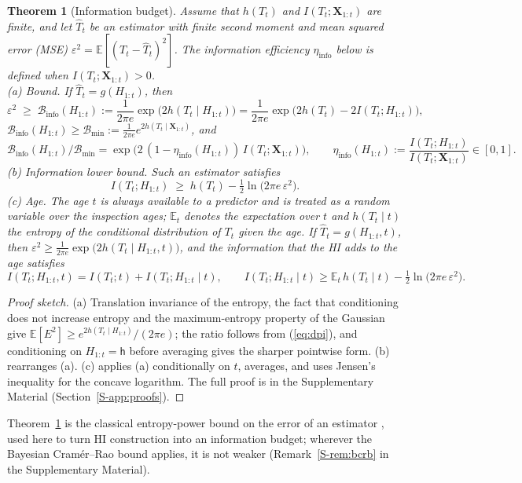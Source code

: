 \documentclass[preprint,12pt]{elsarticle}
\newtheorem{theorem}{Theorem}
\theoremstyle{definition}
\newcommand{\E}{\mathbb{E}}
\newcommand{\Binfo}{\mathcal{B}_{\mathrm{info}}}
\newcommand{\etaPIE}{\eta_{\mathrm{info}}}
\begin{document}
\begin{theorem}[Information budget]
\label{thm:bound}
Assume that $h(T_t)$ and $I(T_t;\mathbf{X}_{1:t})$ are finite, and let $\hat T_t$ be an estimator with finite second moment and mean squared error (MSE) $\varepsilon^2=\E[(T_t-\hat T_t)^2]$. The information efficiency $\etaPIE$ below is defined when $I(T_t;\mathbf{X}_{1:t})>0$.\\
(a) \emph{Bound.} If $\hat T_t=g(H_{1:t})$, then
\begin{equation}
\varepsilon^2\;\ge\;\Binfo(H_{1:t}) := \frac{1}{2\pi e}\exp\!\big(2h(T_t\mid H_{1:t})\big)=\frac{1}{2\pi e}\exp\!\big(2h(T_t)-2I(T_t;H_{1:t})\big),
\end{equation}
$\Binfo(H_{1:t})\ge \mathcal{B}_{\min}:=\frac{1}{2\pi e}e^{2h(T_t\mid \mathbf{X}_{1:t})}$, and
\begin{equation}
\Binfo(H_{1:t})/\mathcal{B}_{\min}=\exp\!\big(2\,(1-\etaPIE(H_{1:t}))\,I(T_t;\mathbf{X}_{1:t})\big),\qquad \etaPIE(H_{1:t}):=\frac{I(T_t;H_{1:t})}{I(T_t;\mathbf{X}_{1:t})}\in[0,1].
\end{equation}
(b) \emph{Information lower bound.} Such an estimator satisfies
\begin{equation}
I(T_t;H_{1:t})\;\ge\;h(T_t)-\tfrac12\ln\!\big(2\pi e\,\varepsilon^2\big).
\end{equation}
(c) \emph{Age.} The age $t$ is always available to a predictor and is treated as a random variable over the inspection ages; $\E_t$ denotes the expectation over $t$ and $h(T_t\mid t)$ the entropy of the conditional distribution of $T_t$ given the age. If $\hat T_t=g(H_{1:t},t)$, then $\varepsilon^2\ge\frac1{2\pi e}\exp\!\big(2h(T_t\mid H_{1:t},t)\big)$, and the information that the HI adds to the age satisfies
\begin{equation}
I(T_t;H_{1:t},t)=I(T_t;t)+I(T_t;H_{1:t}\mid t),\qquad I(T_t;H_{1:t}\mid t)\ge\E_t\,h(T_t\mid t)-\tfrac12\ln\!\big(2\pi e\,\varepsilon^2\big).
\end{equation}
\end{theorem}
\begin{proof}[Proof sketch]
(a) Translation invariance of the entropy, the fact that conditioning does not increase entropy and the maximum-entropy property of the Gaussian give $\E[E^2]\ge e^{2h(T_t\mid H_{1:t})}/(2\pi e)$; the ratio follows from (\ref{eq:dpi}), and conditioning on $H_{1:t}=\mathsf h$ before averaging gives the sharper pointwise form. (b) rearranges (a). (c) applies (a) conditionally on $t$, averages, and uses Jensen's inequality for the concave logarithm. The full proof is in the Supplementary Material (Section~\ref{S-app:proofs}).
\end{proof}
Theorem~\ref{thm:bound} is the classical entropy-power bound on the error of an estimator \cite[Sect.~8.6]{cover2006}, used here to turn HI construction into an information budget; wherever the Bayesian Cram\'er--Rao bound applies, it is not weaker (Remark~\ref{S-rem:bcrb} in the Supplementary Material).
\end{document}
